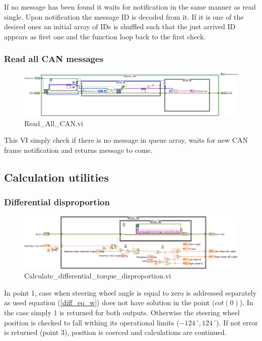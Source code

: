 If no message has been found it waits for notification in the same manner as read single. Upon notification the message ID is decoded from it. If it is one of the desired ones an initial array of IDs is shuffled such that the just arrived ID appears as first one and the function loop back to the first check. 

\subsubsection{Read all CAN messages}
\begin{figure}[H]
    \centering
    \includegraphics[scale=\visc,max width=\textwidth]{figures/Read_All_CANd}
    \caption{Read\_All\_CAN.vi}
    \label{vi:Read_All_CAN}
\end{figure}
This VI simply check if there is no message in queue array, waits for new CAN frame notification and returns message to come.

\subsection{Calculation utilities}
\subsubsection{Differential disproportion} \label{sec:trq_per_wheel_calc}
\begin{figure}[H]
    \centering
    \includegraphics[scale=\visc,max width=\textwidth]{figures/Calculate_differential_torque_disproportiond}
    \caption{Calculate\_differential\_torque\_disproportion.vi}
    \label{vi:Calculate_differential_torque_disproportion}
\end{figure}
In point 1, case when steering wheel angle is equal to zero is addressed separately as used equation (\ref{diff_eq_w}) does not have solution in the point ($cot(0)$). In the case simply 1 is returned for both outputs.
Otherwise the steering wheel position is checked to fall withing its operational limits ($-124\,^{\circ},124\,^{\circ}$). If not error is returned (point 3), position is coerced and calculations are continued.


